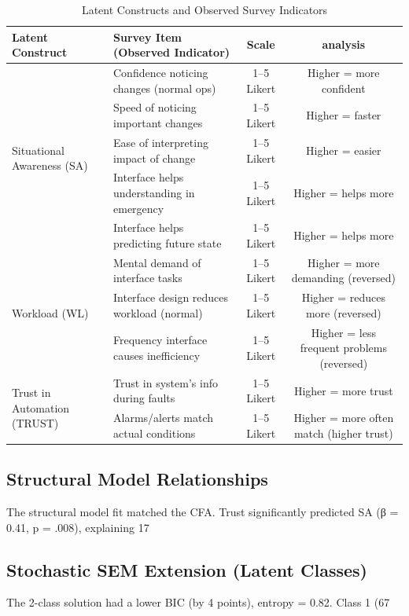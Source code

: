 \documentclass[conference]{IEEEtran}
\begin{document}
\begin{table}[t]
\caption{Latent Constructs and Observed Survey Indicators}
\centering
\begin{tabular}{llcc}
\toprule
Latent Construct & Survey Item (Observed Indicator) & Scale & analysis \\
\midrule
\multirow{5}{*}{Situational Awareness (SA)} & Confidence noticing changes (normal ops) & 1–5 Likert & Higher = more confident \\
 & Speed of noticing important changes & 1–5 Likert & Higher = faster \\
 & Ease of interpreting impact of change & 1–5 Likert & Higher = easier \\
 & Interface helps understanding in emergency & 1–5 Likert & Higher = helps more \\
 & Interface helps predicting future state & 1–5 Likert & Higher = helps more \\
\midrule
\multirow{3}{*}{Workload (WL)} & Mental demand of interface tasks & 1–5 Likert & Higher = more demanding (reversed) \\
 & Interface design reduces workload (normal) & 1–5 Likert & Higher = reduces more (reversed) \\
 & Frequency interface causes inefficiency & 1–5 Likert & Higher = less frequent problems (reversed) \\
\midrule
\multirow{2}{*}{Trust in Automation (TRUST)} & Trust in system’s info during faults & 1–5 Likert & Higher = more trust \\
 & Alarms/alerts match actual conditions & 1–5 Likert & Higher = more often match (higher trust) \\
\bottomrule
\end{tabular}
\label{tab:constructs}
\end{table}
\subsection{Structural Model Relationships}

The structural model fit matched the CFA. Trust significantly predicted SA (β = 0.41, p = .008), explaining 17%

\subsection{Stochastic SEM Extension (Latent Classes)}
The 2-class solution had a lower BIC (by 4 points), entropy = 0.82. Class 1 (67%
\end{document}
